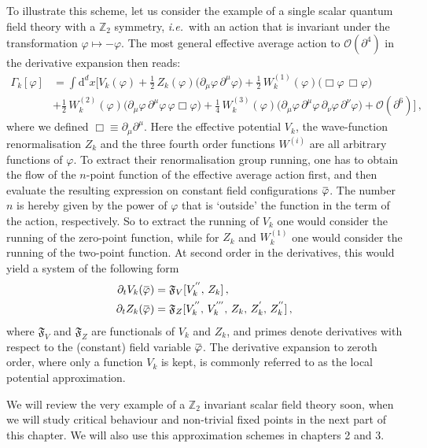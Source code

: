 \documentclass[11pt]{book}
\newcommand{\overbar}[1]{\mkern 1.5mu\overline{\mkern-1.5mu#1\mkern-1.5mu}\mkern 1.5mu}
\newcommand{\bp}{\overbar \varphi}
\newcommand\ie{\textit{i.e.}\ }
\numberwithin{equation}{chapter}
\begin{document}
To illustrate this scheme, let us consider the example of a single
scalar quantum field theory with a $\mathbb Z_2$ symmetry,
\ie with an action that is invariant under the transformation
$\varphi \mapsto -\varphi$. The most general effective
average action to $\mathcal O(\partial^4)$ in the derivative
expansion then reads:
\begin{align}
  \Gamma_k [\varphi] &=
  \int \mathrm d^dx
  \bigg[
    V_k (\varphi)
     + \frac 12 \, Z_k (\varphi) \big( \partial_\mu \varphi \, \partial^\mu \varphi \big)
     + \frac 12 \, W^{(1)}_k (\varphi) \big( \Box \varphi \, \Box \varphi \big) \\
    &+ \frac 12 \, W^{(2)}_k (\varphi) \big( \partial_\mu \varphi \, \partial^\mu \varphi \, \varphi \Box \varphi \big)
     + \frac 14 \, W^{(3)}_k (\varphi) \big( \partial_\mu \varphi \, \partial^\mu \varphi \, \partial_\nu \varphi \, \partial^\nu \varphi \big)
     + \mathcal O (\partial ^6)
  \bigg] \,,
\end{align}
where we defined $\Box \equiv \partial_\mu \partial^\mu$.
Here the effective potential $V_k$, the wave-function renormalisation
$Z_k$ and the three fourth order functions $W^{(i)}$ are all
arbitrary functions of $\varphi$. To extract their renormalisation
group running, one has to obtain the flow of the $n$-point
function of the effective average action first, and then evaluate
the resulting expression on constant field configurations $\bp$.
The number $n$ is hereby given by the power of $\varphi$ that is
`outside' the function in the term of the action, respectively.
So to extract the running of $V_k$ one would consider the running
of the zero-point function, while for $Z_k$ and $W^{(1)}_k$ one would
consider the running of the two-point function.
At second order in the derivatives, this would yield a system
of the following form
\begin{align}
  \partial_t V_k(\bp) &= \mathfrak F_V [ V_k^{''}, \, Z_k ] \,, \\
  \partial_t Z_k(\bp) &= \mathfrak F_Z [ V_k^{''}, \, V_k^{'''}, \,
  Z_k, \, Z_k^{'}, \, Z_k^{''} ] \,,
\end{align}
where $\mathfrak F_V$ and $\mathfrak F_Z$ are functionals of $V_k$
and $Z_k$, and primes denote derivatives with respect to the
(constant) field variable $\bp$. The derivative expansion to zeroth order,
where only a function $V_k$ is kept, is commonly referred to as the
local potential approximation.

We will review the very example of a $\mathbb Z_2$ invariant scalar
field theory soon, when we will study critical behaviour and non-trivial fixed points
in the next part of this chapter. We will also use this
approximation schemes in chapters 2 and 3.
\end{document}
